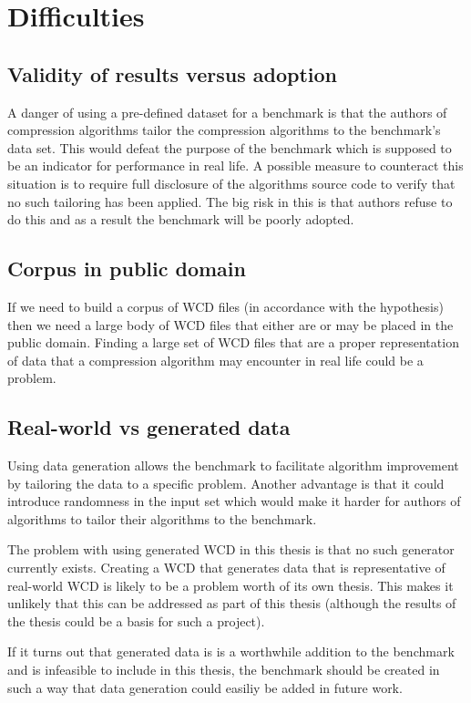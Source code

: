 \section{Difficulties}
\subsection{Validity of results versus adoption}
A danger of using a pre-defined dataset for a benchmark is that the authors of compression algorithms tailor the compression algorithms to the benchmark's data set. This would defeat the purpose of the benchmark which is supposed to be an indicator for performance in real life. A possible measure to counteract this situation is to require full disclosure of the algorithms source code to verify that no such tailoring has been applied. The big risk in this is that authors refuse to do this and as a result the benchmark will be poorly adopted. 

\subsection{Corpus in public domain}
If we need to build a corpus of WCD files (in accordance with the hypothesis) then we need a large body of WCD files that either are or may be placed in the public domain\cite{arnold1997corpus}. Finding a large set of WCD files that are a proper representation of data that a compression algorithm may encounter in real life could be a problem.

\subsection{Real-world vs generated data}
Using data generation allows the benchmark to facilitate algorithm improvement by tailoring the data to a specific problem. Another advantage is that it could introduce randomness in the input set which would make it harder for authors of algorithms to tailor their algorithms to the benchmark.

The problem with using generated WCD in this thesis is that no such generator currently exists. Creating a WCD that generates data that is representative of real-world WCD is likely to be a problem worth of its own thesis. This makes it unlikely that this can be addressed as part of this thesis (although the results of the thesis could be a basis for such a project).

If it turns out that generated data is is a worthwhile addition to the benchmark and is infeasible to include in this thesis, the benchmark should be created in such a way that data generation could easiliy be added in future work.


